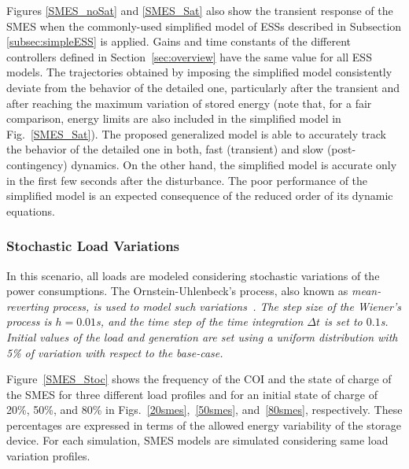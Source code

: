\documentclass[journal, a4paper]{IEEEtran}
\begin{document}
Figures \ref{SMES_noSat} and \ref{SMES_Sat} also show the transient
response of the SMES when the commonly-used simplified model of ESSs described in
Subsection \ref{subsec:simpleESS} is applied.  Gains and time
  constants of the different controllers defined in
  Section~\ref{sec:overview} have the same value for all ESS models.
The trajectories obtained by imposing the simplified model
consistently deviate from the behavior of the detailed one,
particularly after the transient and after reaching the maximum variation of stored
  energy (note that, for a fair comparison, energy limits are also
included in the simplified model in Fig.~\ref{SMES_Sat}). 
The proposed generalized model is able to accurately track the behavior
  of the detailed one in both, fast (transient) and slow
  (post-contingency) dynamics. On the other hand, the simplified model
  is accurate only in the first few seconds after the disturbance.
  The poor performance of the simplified model is an expected
  consequence of the reduced order of its dynamic equations.

\subsubsection{Stochastic Load Variations}
\label{subsub:smesstoc}



In this scenario, all loads are modeled considering stochastic variations
of the power consumptions.
The Ornstein-Uhlenbeck’s process, also known as \it mean-reverting \rm process, is
used to model such variations~\cite{perninge:10, milano:2013}. 
The step size of the Wiener's process is $h = 0.01$s, and the time
step of the time integration $\Delta t$ is set to $0.1$s. Initial values of the load and 
generation are set using a uniform distribution with 5\% of variation with respect to the base-case.

Figure~\ref{SMES_Stoc} shows the frequency of the COI and the state of charge of the SMES 
for three different load profiles and for an initial state of charge of 
20\%, 50\%, and 80\% in Figs.~\ref{20smes},~\ref{50smes}, and~\ref{80smes}, respectively.
These percentages are expressed in terms of the allowed energy 
variability of the storage device.
For each simulation, SMES models are simulated considering same load variation profiles. 
\end{document}
